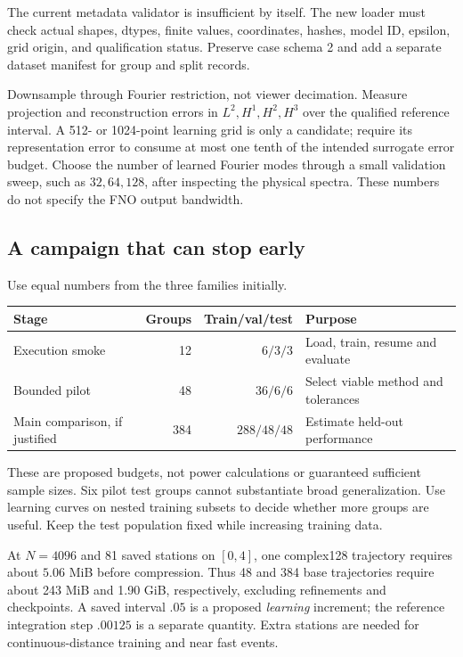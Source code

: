 The current metadata validator is insufficient by itself. The new loader
must check actual shapes, dtypes, finite values, coordinates, hashes,
model ID, epsilon, grid origin, and qualification status. Preserve case
schema 2 and add a separate dataset manifest for group and split records.

Downsample through Fourier restriction, not viewer decimation. Measure
projection and reconstruction errors in $L^2,H^1,H^2,H^3$ over the
qualified reference interval. A 512- or 1024-point learning grid is only a
candidate; require its representation error to consume at most one tenth
of the intended surrogate error budget. Choose the number of learned
Fourier modes through a small validation sweep, such as $32,64,128$,
after inspecting the physical spectra. These numbers do not specify the
FNO output bandwidth.

\subsection{A campaign that can stop early}
Use equal numbers from the three families initially.
\begin{center}
\small
\begin{tabular}{p{.28\linewidth}rrp{.25\linewidth}}
\toprule
Stage & Groups & Train/val/test & Purpose\\
\midrule
Execution smoke & 12 & $6/3/3$ & Load, train, resume and evaluate\\
Bounded pilot & 48 & $36/6/6$ & Select viable method and tolerances\\
Main comparison, if justified & 384 & $288/48/48$ & Estimate held-out performance\\
\bottomrule
\end{tabular}
\end{center}
These are proposed budgets, not power calculations or guaranteed
sufficient sample sizes. Six pilot test groups cannot substantiate broad
generalization. Use learning curves on nested training subsets to decide
whether more groups are useful. Keep the test population fixed while
increasing training data.

At $N=4096$ and 81 saved stations on $[0,4]$, one complex128 trajectory
requires about $5.06$ MiB before compression. Thus 48 and 384 base
trajectories require about 243 MiB and 1.90 GiB, respectively, excluding
refinements and checkpoints. A saved interval $.05$ is a proposed
\emph{learning} increment; the reference integration step $.00125$
is a separate quantity. Extra stations are needed for continuous-distance
training and near fast events.

